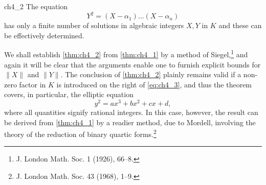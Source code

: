 \begin{mythm}{}{ch4_2}
The equation
\begin{equation} \label{eq:ch4_3}\tag{3}
Y^2 = (X - \alpha_1) \dots (X - \alpha_n)
\end{equation}
has only a finite number of solutions in algebraic integers $X, Y$ in $K$ and these can be effectively determined.
\end{mythm}

We shall establish \autoref{thm:ch4_2} from \autoref{thm:ch4_1} by a method of Siegel,\footnote{J. London Math. Soc. 1 (1926), 66--8.} and again it will be clear that the arguments enable one to furnish explicit bounds for $\|X\|$ and $\|Y\|$. The conclusion of \autoref{thm:ch4_2} plainly remains valid if a non-zero factor in $K$ is introduced on the right of \eqref{eq:ch4_3}, and thus the theorem covers, in particular, the elliptic equation
\[
y^2 = ax^3 + bx^2 + cx + d,
\]
where all quantities signify rational integers. In this case, however, the result can be derived from \autoref{thm:ch4_1} by a readier method, due to Mordell, involving the theory of the reduction of binary quartic forms.\footnote{J. London Math. Soc. 43 (1968), 1--9.}

